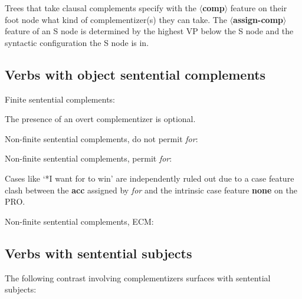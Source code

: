 Trees that take clausal complements specify with the {\bf $\langle$comp$\rangle$} feature 
on their foot node what kind of complementizer(s) they can take. 
The {\bf $\langle$assign-comp$\rangle$} feature of an S node is determined 
by the highest VP below the S node and the syntactic configuration 
the S node is in. 
 
\subsection{Verbs with object sentential complements} 
Finite sentential complements: 
 
\beginsentences
{}\label{ex:229} 
\label{ex:230} 
\label{ex:231} 
\endsentences

 
The presence of an overt complementizer is optional. 
 
Non-finite sentential complements, do not permit {\em for}: 
 
\beginsentences
{}\label{ex:232} 
\label{ex:233} 
\label{ex:234} 
\endsentences

 
Non-finite sentential complements, permit {\em for}: 
 
\beginsentences
{}\label{ex:235} 
\label{ex:236} 
\label{ex:237} 
\endsentences

 
Cases like `*I want for to win' are independently ruled out due to a 
case feature clash between the {\bf acc} assigned by {\em for} and the 
intrinsic case feature {\bf none} on the PRO. 
 
Non-finite sentential complements, ECM: 
 
\beginsentences
{}\label{ex:238} 
\label{ex:239} 
\label{ex:240} 
\endsentences

 
 
\subsection{Verbs with sentential subjects} 
The following contrast involving complementizers surfaces with sentential 
subjects: 
 
